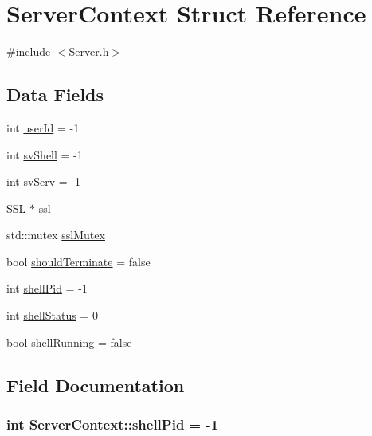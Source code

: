 \hypertarget{structServerContext}{}\section{Server\+Context Struct Reference}
\label{structServerContext}


{\ttfamily \#include $<$Server.\+h$>$}

\subsection*{Data Fields}
\begin{DoxyCompactItemize}
\item 
int \hyperlink{structServerContext_a3896143ad0272c9faa55b5278e48ddef}{user\+Id} = -\/1
\item 
int \hyperlink{structServerContext_a2d08d74a2daaedabbcce115bdf8f05fa}{sv\+Shell} = -\/1
\item 
int \hyperlink{structServerContext_a728b751fab25a3042eb9e6b668bc9fb3}{sv\+Serv} = -\/1
\item 
S\+SL $\ast$ \hyperlink{structServerContext_a8ae67e20dfa22be8e22d03e7ea195113}{ssl}
\item 
std\+::mutex \hyperlink{structServerContext_adaf5a8ecb1b63b5dd2b932260fb99145}{ssl\+Mutex}
\item 
bool \hyperlink{structServerContext_a66fa302afc00b08a437e23858d5c371f}{should\+Terminate} = false
\item 
int \hyperlink{structServerContext_a74d22304cd75cb80b3899507c83e3941}{shell\+Pid} = -\/1
\item 
int \hyperlink{structServerContext_a5704a178d3f70e1b514b8fb9d21c8a42}{shell\+Status} = 0
\item 
bool \hyperlink{structServerContext_ad0a0299ad274c033c44da46a775d8702}{shell\+Running} = false
\end{DoxyCompactItemize}


\subsection{Field Documentation}
\subsubsection[{\texorpdfstring{shell\+Pid}{shellPid}}]{\setlength{\rightskip}{0pt plus 5cm}int Server\+Context\+::shell\+Pid = -\/1}\hypertarget{structServerContext_a74d22304cd75cb80b3899507c83e3941}{}\label{structServerContext_a74d22304cd75cb80b3899507c83e3941}
